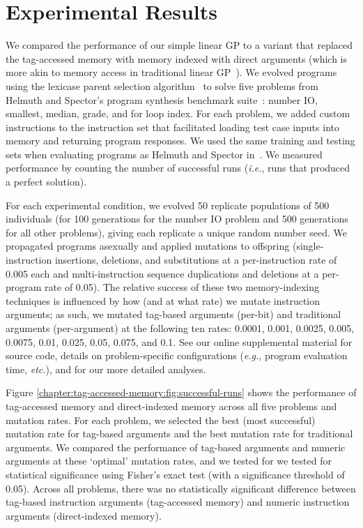 \section{Experimental Results}

We compared the performance of our simple linear GP to a variant that replaced the tag-accessed memory with memory indexed with direct arguments (which is more akin to memory access in traditional linear GP~\citep{brameier_linear_2007}).
We evolved programs using the lexicase parent selection algorithm~\cite{helmuth_solving_2015} to solve five problems from Helmuth and Spector's program synthesis benchmark suite~\citep{helmuth_general_2015}: number IO, smallest, median, grade, and for loop index.
For each problem, we added custom instructions to the instruction set that facilitated loading test case inputs into memory and returning program responses. 
We used the same training and testing sets when evaluating programs as Helmuth and Spector in~\citep{helmuth_general_2015}.
We measured performance by counting the number of successful runs (\textit{i.e.}, runs that produced a perfect solution).%

For each experimental condition, we evolved 50 replicate populations of 500 individuals (for 100 generations for the number IO problem and 500 generations for all other problems), giving each replicate a unique random number seed.
We propagated programs asexually and applied mutations to offspring (single-instruction insertions, deletions, and substitutions at a per-instruction rate of 0.005 each and multi-instruction sequence duplications and deletions at a per-program rate of 0.05). 
The relative success of these two memory-indexing techniques is influenced by how (and at what rate) we mutate instruction arguments; as such, we mutated tag-based arguments (per-bit) and traditional arguments (per-argument) at the following ten rates: 0.0001, 0.001, 0.0025, 0.005, 0.0075, 0.01, 0.025, 0.05, 0.075, and 0.1. 
See our online supplemental material \citep{tag_accessed_memory_supplement_2019} for source code, details on problem-specific configurations (\textit{e.g.}, program evaluation time, \textit{etc.}), and for our more detailed analyses.



Figure \ref{chapter:tag-accessed-memory:fig:successful-runs} shows the performance of tag-accessed memory and direct-indexed memory across all five problems and mutation rates.
For each problem, we selected the best (most successful) mutation rate for tag-based arguments and the best mutation rate for traditional arguments.
We compared the performance of tag-based arguments and numeric arguments at these `optimal' mutation rates, and we tested for we tested for statistical significance using Fisher's exact test (with a significance threshold of 0.05). 
Across all problems, there was no statistically significant difference between tag-based instruction arguments (tag-accessed memory) and numeric instruction arguments (direct-indexed memory).
